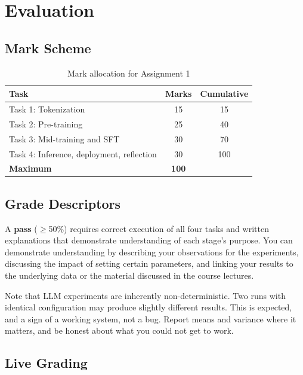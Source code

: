 \section{Evaluation}
\label{sec:evaluation}

\subsection{Mark Scheme}

\begin{table}[h]
\centering
\caption{Mark allocation for Assignment 1}
\label{tab:marks}
\begin{tabular}{lcc}
\toprule
\textbf{Task} & \textbf{Marks} & \textbf{Cumulative} \\
\midrule
Task 1: Tokenization                         & 15 & 15 \\
Task 2: Pre-training                         & 25 & 40 \\
Task 3: Mid-training and SFT                 & 30 & 70 \\
Task 4: Inference, deployment, reflection    & 30 & 100 \\
\midrule
\textbf{Maximum}                             & \textbf{100} & \\
\bottomrule
\end{tabular}
\end{table}

\subsection{Grade Descriptors}
A \textbf{pass} ($\geq$50\%) requires correct execution of all four tasks and written explanations that demonstrate understanding of each stage's purpose. You can demonstrate understanding by describing your observations for the experiments, discussing the impact of setting certain parameters, and linking your results to the underlying data or the material discussed in the course lectures.

Note that LLM experiments are inherently non-deterministic.  Two runs with identical configuration may produce slightly different results.  This is expected, and a sign of a working system, not a bug.  Report means and variance where it matters, and be honest about what you could not get to work.

\subsection{Live Grading}

